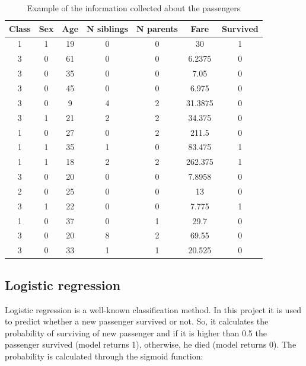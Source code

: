 \documentclass{article}
\begin{document}
\begin{table}[h]
  \center
  \begin{tabular}{ccccccc}
    Class & Sex & Age & N siblings & N parents & Fare    & Survived \\
    \hline
    1     & 1   & 19  & 0          & 0         & 30      & 1        \\
    3     & 0   & 61  & 0          & 0         & 6.2375  & 0        \\
    3     & 0   & 35  & 0          & 0         & 7.05    & 0        \\
    3     & 0   & 45  & 0          & 0         & 6.975   & 0        \\
    3     & 0   & 9   & 4          & 2         & 31.3875 & 0        \\
    3     & 1   & 21  & 2          & 2         & 34.375  & 0        \\
    1     & 0   & 27  & 0          & 2         & 211.5   & 0        \\
    1     & 1   & 35  & 1          & 0         & 83.475  & 1        \\
    1     & 1   & 18  & 2          & 2         & 262.375 & 1        \\
    3     & 0   & 20  & 0          & 0         & 7.8958  & 0        \\
    2     & 0   & 25  & 0          & 0         & 13      & 0        \\
    3     & 1   & 22  & 0          & 0         & 7.775   & 1        \\
    1     & 0   & 37  & 0          & 1         & 29.7    & 0        \\
    3     & 0   & 20  & 8          & 2         & 69.55   & 0        \\
    3     & 0   & 33  & 1          & 1         & 20.525  & 0        \\
  \end{tabular}
  \label{table:titainc_passengers}
  \caption{Example of the information collected about the passengers}
\end{table}
\egroup
\clearpage
\subsection{Logistic regression}
Logistic regression is a well-known classification method.
In this project it is used to predict whether a new passenger survived or not.
So, it calculates the probability of surviving of new passenger and
if it is higher than 0.5 the passenger survived (model returns 1),
otherwise, he died (model returns 0).
The probability is calculated through the sigmoid function:
\end{document}
